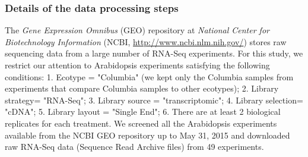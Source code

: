 \documentclass[letterpaper,12pt]{article}
\begin{document}
\subsubsection*{Details of the data processing steps}
The \textit{Gene Expression Omnibus} (GEO) repository at \textit{National
Center for Biotechnology Information} (NCBI,
\url{http://www.ncbi.nlm.nih.gov/}) stores raw sequencing data from a large
number of RNA-Seq experiments.  For this study, we restrict our attention to
Arabidopsis experiments satisfying the following conditions: 1.  Ecotype =
"Columbia" (we kept only the Columbia samples from experiments that compare
Columbia samples to other ecotypes); 2. Library strategy= "RNA-Seq"; 3.
Library source = "transcriptomic"; 4.  Library selection= "cDNA"; 5.  Library
layout = "Single End"; 6. There are at least 2 biological replicates for each
treatment. We screened all the Arabidopsis experiments available from the NCBI
GEO repository up to May 31, 2015 and downloaded raw RNA-Seq data (Sequence Read Archive files)
from 49 experiments. %
\end{document}
